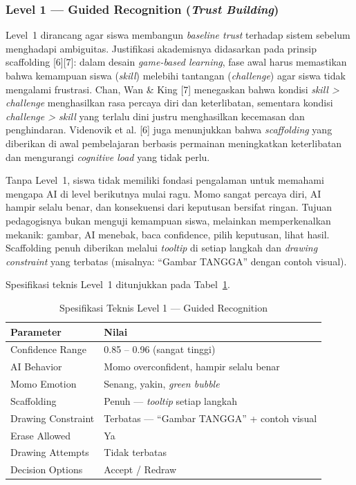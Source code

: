 \subsubsection{Level 1 --- Guided Recognition (\textit{Trust Building})}

Level~1 dirancang agar siswa membangun \textit{baseline trust} terhadap sistem sebelum menghadapi ambiguitas. Justifikasi akademisnya didasarkan pada prinsip scaffolding [6][7]: dalam desain \textit{game-based learning}, fase awal harus memastikan bahwa kemampuan siswa (\textit{skill}) melebihi tantangan (\textit{challenge}) agar siswa tidak mengalami frustrasi. Chan, Wan \& King [7] menegaskan bahwa kondisi \textit{skill > challenge} menghasilkan rasa percaya diri dan keterlibatan, sementara kondisi \textit{challenge > skill} yang terlalu dini justru menghasilkan kecemasan dan penghindaran. Videnovik et al. [6] juga menunjukkan bahwa \textit{scaffolding} yang diberikan di awal pembelajaran berbasis permainan meningkatkan keterlibatan dan mengurangi \textit{cognitive load} yang tidak perlu.

Tanpa Level~1, siswa tidak memiliki fondasi pengalaman untuk memahami mengapa AI di level berikutnya mulai ragu. Momo sangat percaya diri, AI hampir selalu benar, dan konsekuensi dari keputusan bersifat ringan. Tujuan pedagogisnya bukan menguji kemampuan siswa, melainkan memperkenalkan mekanik: gambar, AI menebak, baca confidence, pilih keputusan, lihat hasil. Scaffolding penuh diberikan melalui \textit{tooltip} di setiap langkah dan \textit{drawing constraint} yang terbatas (misalnya: ``Gambar TANGGA'' dengan contoh visual).

Spesifikasi teknis Level~1 ditunjukkan pada Tabel~\ref{tab:level1-spec}.

\begin{table}[H]
\centering
\caption{Spesifikasi Teknis Level 1 --- Guided Recognition}
\label{tab:level1-spec}
\begin{tabular}{|l|l|}
\hline
\textbf{Parameter} & \textbf{Nilai} \\ \hline
Confidence Range & 0.85 -- 0.96 (sangat tinggi) \\ \hline
AI Behavior & Momo overconfident, hampir selalu benar \\ \hline
Momo Emotion & Senang, yakin, \textit{green bubble} \\ \hline
Scaffolding & Penuh --- \textit{tooltip} setiap langkah \\ \hline
Drawing Constraint & Terbatas --- ``Gambar TANGGA'' + contoh visual \\ \hline
Erase Allowed & Ya \\ \hline
Drawing Attempts & Tidak terbatas \\ \hline
Decision Options & Accept / Redraw \\ \hline
\end{tabular}
\end{table}

